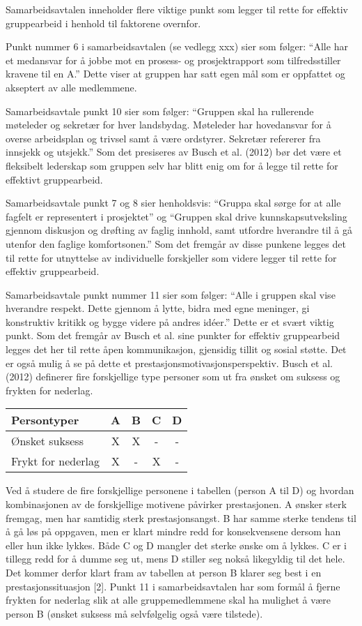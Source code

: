 Samarbeidsavtalen inneholder flere viktige punkt som legger til rette for effektiv gruppearbeid i henhold til faktorene overnfor.

Punkt nummer 6 i samarbeidsavtalen (se vedlegg xxx) sier som følger:
“Alle har et medansvar for å jobbe mot en prosess- og prosjektrapport som tilfredsstiller kravene til en A.”
Dette viser at gruppen har satt egen mål som er oppfattet og akseptert av alle medlemmene.

Samarbeidsavtale punkt 10 sier som følger:
“Gruppen skal ha rullerende møteleder og sekretær for hver landsbydag.
Møteleder har hovedansvar for å overse arbeidsplan og trivsel samt å være ordstyrer.
Sekretær refererer fra innsjekk og utsjekk.”
Som det presiseres av Busch et al. (2012) bør det være et fleksibelt lederskap som gruppen selv har blitt enig om for å legge til rette for effektivt gruppearbeid.

Samarbeidsavtale punkt 7 og 8 sier henholdsvis:
“Gruppa skal sørge for at alle fagfelt er representert i prosjektet” og “Gruppen skal drive kunnskapsutveksling gjennom diskusjon og drøfting av faglig innhold, samt utfordre hverandre til å gå utenfor den faglige komfortsonen.”
Som det fremgår av disse punkene legges det til rette for utnyttelse av individuelle forskjeller som videre legger til rette for effektiv gruppearbeid.

Samarbeidsavtale punkt nummer 11 sier som følger:
“Alle i gruppen skal vise hverandre respekt. Dette gjennom å lytte, bidra med egne meninger, gi konstruktiv kritikk og bygge videre på andres idéer.”
Dette er et svært viktig punkt.
Som det fremgår av Busch et al. sine punkter for effektiv gruppearbeid legges det her til rette åpen kommunikasjon, gjensidig tillit og sosial støtte.
Det er også mulig å se på dette et prestasjonsmotivasjonsperspektiv.
Busch et al. (2012) definerer fire forskjellige type personer som ut fra ønsket om suksess og frykten for nederlag.

\begin{center}
	\begin{tabular}{|l|c|c|c|c|}
		\hline
		Persontyper & A & B & C & D \\ \hline
		Ønsket suksess & X & X & - & - \\ \hline
		Frykt for nederlag & X & - & X & - \\ \hline
	\end{tabular}
\end{center}

Ved å studere de fire forskjellige personene i tabellen (person A til D) og hvordan kombinasjonen av de forskjellige motivene påvirker prestasjonen.
A ønsker sterk fremgag, men har samtidig sterk prestasjonsangst.
B har samme sterke tendens til å gå løs på oppgaven, men er klart mindre redd for konsekvensene dersom han eller hun ikke lykkes.
Både C og D mangler det sterke ønske om å lykkes.
C er i tillegg redd for å dumme seg ut, mens D stiller seg nokså likegyldig til det hele.
Det kommer derfor klart fram av tabellen at person B klarer seg best i en prestasjonssituasjon [2].
Punkt 11 i samarbeidsavtalen har som formål å fjerne frykten for nederlag slik at alle gruppemedlemmene skal ha mulighet å være person B (ønsket suksess må selvfølgelig også være tilstede).

